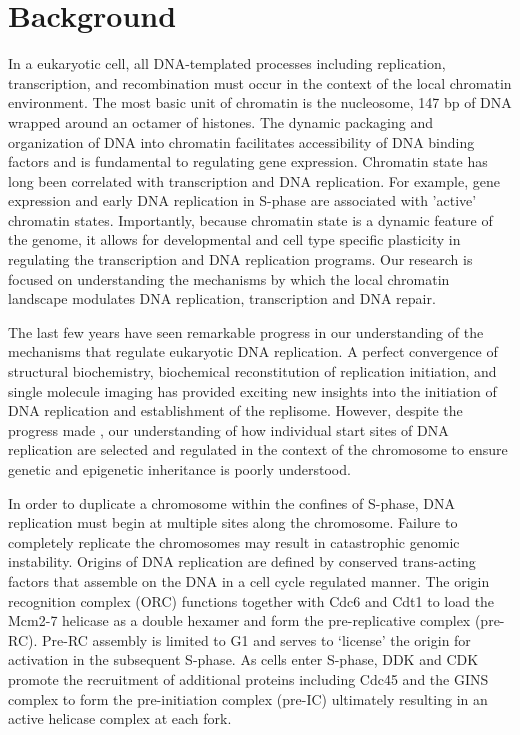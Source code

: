 \section{Background}
In a eukaryotic cell, all DNA-templated processes including replication, transcription, and recombination must occur in the context of the local chromatin environment.  The most basic unit of chromatin is the nucleosome, 147 bp of DNA wrapped around an octamer of histones\citep{McGinty2015-kd}.  The dynamic packaging and organization of DNA into chromatin facilitates accessibility of DNA binding factors and is fundamental to regulating gene expression\citep{Kouzarides2007-sk}. Chromatin state has long been correlated with transcription and DNA replication\citep{Stambrook1970-jm,Goldman1984-im}.  For example, gene expression and early DNA replication in S-phase are associated with 'active' chromatin states\citep{Rhind2013-yr}. Importantly, because chromatin state is a dynamic feature of the genome, it allows for developmental and cell type specific plasticity in regulating the transcription and DNA replication programs\citep{Goren2008-wr}.  Our research is focused on understanding the mechanisms by which the local chromatin landscape modulates DNA replication, transcription and DNA repair.

The last few years have seen remarkable progress in our understanding of the mechanisms that regulate eukaryotic DNA replication.  A perfect convergence of structural biochemistry\citep{Bleichert2015-zl,Li2015-zi,Yuan2017-gq}, biochemical reconstitution of replication initiation\citep{Yeeles2015-pe,Devbhandari2017-fh,Azmi2017-gg}, and single molecule imaging\citep{Ticau2015-gg} has provided exciting new insights into the initiation of DNA replication and establishment of the replisome.  However, despite the progress made \invitro, our understanding of how individual start sites of DNA replication are selected and regulated in the context of the chromosome to ensure genetic and epigenetic inheritance is poorly understood\citep{Prioleau2016-bj}. 

In order to duplicate a chromosome within the confines of S-phase, DNA replication must begin at multiple sites along the chromosome.  Failure to completely replicate the chromosomes may result in catastrophic genomic instability\citep{Green2010-ht}.  Origins of DNA replication are defined by conserved trans-acting factors that assemble on the DNA in  a cell cycle regulated manner. %
The origin recognition complex (ORC) functions together with Cdc6 and Cdt1 to load the Mcm2-7 helicase as a double hexamer and form the pre-replicative complex (pre-RC)\citep{Bell2013-pk}. Pre-RC assembly is limited to G1 and serves to `license' the origin for activation in the subsequent S-phase\citep{Siddiqui2013-jz}. 
As cells enter S-phase, DDK and CDK promote the recruitment of additional proteins including Cdc45 and the GINS complex to form the pre-initiation complex (pre-IC)\citep{Tanaka2013-fl} ultimately resulting in an active helicase complex at each fork.   

